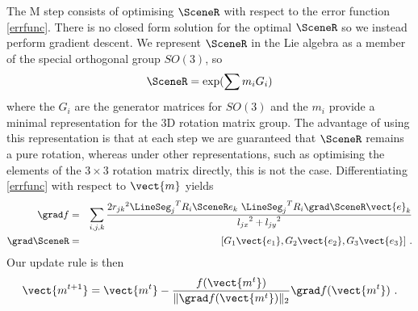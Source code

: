 The M step consists of optimising $\SceneR$ with respect to the
error function \eqref{errfunc}. There is no closed form solution for
the optimal $\SceneR$ so we instead perform gradient descent. We represent
$\SceneR$ in the Lie algebra as a member of the special orthogonal group
$SO(3)$, so
\begin{equation}
  \SceneR = \exp(\sum m_i G_i)
\end{equation}
where the $G_i$ are the generator matrices for $SO(3)$ and the $m_i$
provide a minimal representation for the 3D rotation matrix group. The
advantage of using this representation is that at each step we are
guaranteed that $\SceneR$ remains a pure rotation, whereas under other
representations, such as optimising the elements of the $3 \times 3$
rotation matrix directly, this is not the case. Differentiating
\eqref{errfunc} with respect to $\vect{m}$ yields
\begin{eqnarray}
  \grad f &=& \sum_{i,j,k}
  \frac{2{r_{jk}}^2 {\LineSeg_j}^T R_i \SceneR e_k ~
         {\LineSeg_j}^T R_i \grad \SceneR \vect{e}_k}
       {{l_{jx}}^2 + {l_{jy}}^2}\\
  \grad \SceneR & =& [G_1 \vect{e_1} , G_2\vect{e_2} , G_3\vect{e_3}] ~.
\end{eqnarray}
Our update rule is then
\begin{equation}
  \vect{m^{t+1}} = \vect{m^t} - \frac{f(\vect{m^t})}
       {\|\grad f(\vect{m^t})\|_2} \grad f(\vect{m^t}) ~.
\end{equation}
